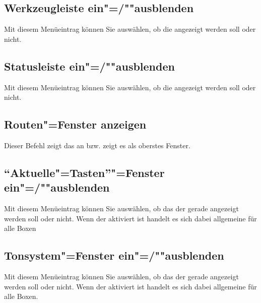\subsection{Werkzeugleiste ein"=/""ausblenden}
\label{sec:MI_TOOLBAR}

Mit diesem Menüeintrag können Sie auswählen, ob die
 angezeigt werden soll oder
nicht.


\subsection{Statusleiste ein"=/""ausblenden}
\label{sec:MI_STATUS}

Mit diesem Menüeintrag können Sie auswählen, ob die  
angezeigt werden soll oder nicht.


\subsection{Routen"=Fenster anzeigen}\label{sec:MI_ROUTES}


Dieser Befehl zeigt das  an bzw. 
zeigt es als oberstes Fenster.


\subsection{"`Aktuelle"=Tasten"'"=Fenster ein"=/""ausblenden}\label{sec:MI_KEY}
Mit diesem Menüeintrag können Sie auswählen, ob das
 der gerade
 angezeigt werden soll oder
nicht. Wenn der 
aktiviert ist handelt es sich dabei allgemeine
 für alle Boxen


\subsection{Tonsystem"=Fenster ein"=/""ausblenden}
\label{sec:MI_TS}
Mit diesem Menüeintrag können Sie auswählen, ob das
 der gerade
 angezeigt werden soll oder
nicht. Wenn der 
aktiviert ist handelt es sich dabei allgemeine
 für alle Boxen.


